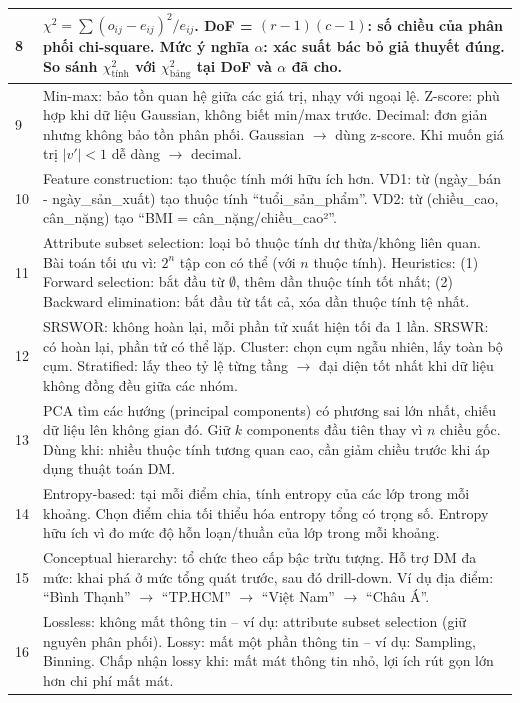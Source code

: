 \documentclass[10pt]{article}
\begin{document}
\begin{singlespace}
\begin{longtable}{|p{}|p{}|}
\hline
8 & $\chi^2 = \sum (o_{ij} - e_{ij})^2/e_{ij}$. DoF = $(r-1)(c-1)$: số chiều của phân phối chi-square. Mức ý nghĩa $\alpha$: xác suất bác bỏ giả thuyết đúng. So sánh $\chi^2_{\text{tính}}$ với $\chi^2_{\text{bảng}}$ tại DoF và $\alpha$ đã cho. \\
\hline
9 & Min-max: bảo tồn quan hệ giữa các giá trị, nhạy với ngoại lệ. Z-score: phù hợp khi dữ liệu Gaussian, không biết min/max trước. Decimal: đơn giản nhưng không bảo tồn phân phối. Gaussian $\to$ dùng z-score. Khi muốn giá trị $|v'| < 1$ dễ dàng $\to$ decimal. \\
\hline
10 & Feature construction: tạo thuộc tính mới hữu ích hơn. VD1: từ (ngày\_bán - ngày\_sản\_xuất) tạo thuộc tính ``tuổi\_sản\_phẩm''. VD2: từ (chiều\_cao, cân\_nặng) tạo ``BMI = cân\_nặng/chiều\_cao²''. \\
\hline
11 & Attribute subset selection: loại bỏ thuộc tính dư thừa/không liên quan. Bài toán tối ưu vì: $2^n$ tập con có thể (với $n$ thuộc tính). Heuristics: (1) Forward selection: bắt đầu từ $\emptyset$, thêm dần thuộc tính tốt nhất; (2) Backward elimination: bắt đầu từ tất cả, xóa dần thuộc tính tệ nhất. \\
\hline
12 & SRSWOR: không hoàn lại, mỗi phần tử xuất hiện tối đa 1 lần. SRSWR: có hoàn lại, phần tử có thể lặp. Cluster: chọn cụm ngẫu nhiên, lấy toàn bộ cụm. Stratified: lấy theo tỷ lệ từng tầng $\to$ đại diện tốt nhất khi dữ liệu không đồng đều giữa các nhóm. \\
\hline
13 & PCA tìm các hướng (principal components) có phương sai lớn nhất, chiếu dữ liệu lên không gian đó. Giữ $k$ components đầu tiên thay vì $n$ chiều gốc. Dùng khi: nhiều thuộc tính tương quan cao, cần giảm chiều trước khi áp dụng thuật toán DM. \\
\hline
14 & Entropy-based: tại mỗi điểm chia, tính entropy của các lớp trong mỗi khoảng. Chọn điểm chia tối thiểu hóa entropy tổng có trọng số. Entropy hữu ích vì đo mức độ hỗn loạn/thuần của lớp trong mỗi khoảng. \\
\hline
15 & Conceptual hierarchy: tổ chức theo cấp bậc trừu tượng. Hỗ trợ DM đa mức: khai phá ở mức tổng quát trước, sau đó drill-down. Ví dụ địa điểm: ``Bình Thạnh'' $\to$ ``TP.HCM'' $\to$ ``Việt Nam'' $\to$ ``Châu Á''. \\
\hline
16 & Lossless: không mất thông tin -- ví dụ: attribute subset selection (giữ nguyên phân phối). Lossy: mất một phần thông tin -- ví dụ: Sampling, Binning. Chấp nhận lossy khi: mất mát thông tin nhỏ, lợi ích rút gọn lớn hơn chi phí mất mát. \\

\end{longtable}
\end{singlespace}
\end{document}
